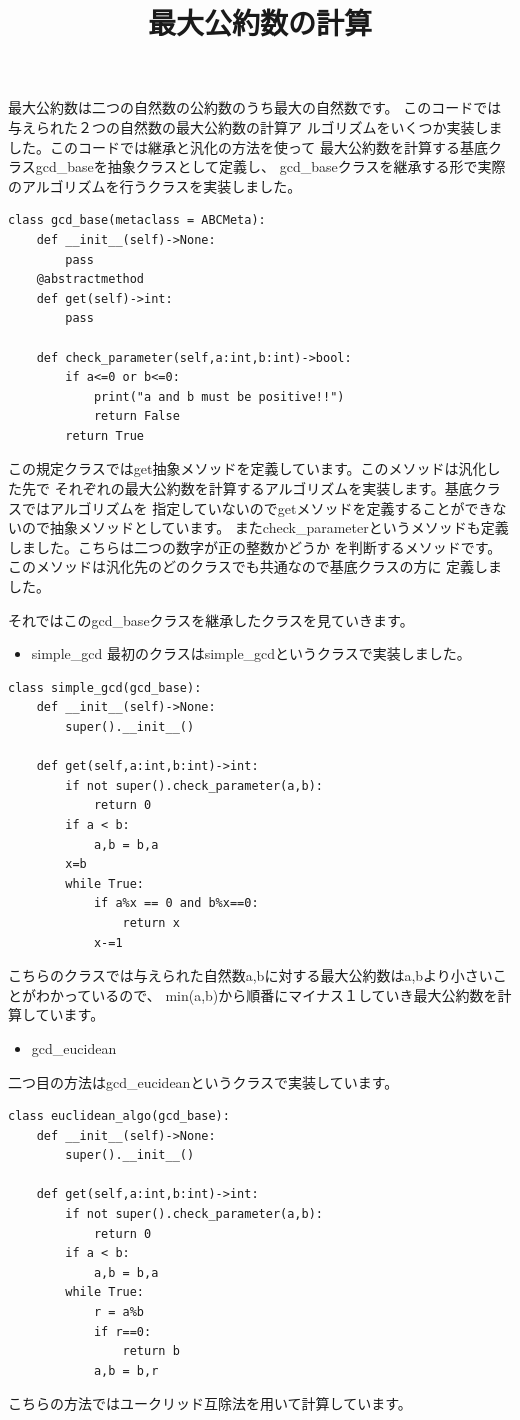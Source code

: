 \documentclass[dvipdfmx]{jarticle}
\title{最大公約数の計算}
\author{}
\date{}
\begin{document}
\maketitle
最大公約数は二つの自然数の公約数のうち最大の自然数です。
このコードでは与えられた２つの自然数の最大公約数の計算ア
ルゴリズムをいくつか実装しました。このコードでは継承と汎化の方法を使って
最大公約数を計算する基底クラスgcd\_baseを抽象クラスとして定義し、
gcd\_baseクラスを継承する形で実際のアルゴリズムを行うクラスを実装しました。
\begin{lstlisting}[caption=gcd\_base,label=base]
class gcd_base(metaclass = ABCMeta):
    def __init__(self)->None:
        pass
    @abstractmethod
    def get(self)->int:
        pass

    def check_parameter(self,a:int,b:int)->bool:
        if a<=0 or b<=0:
            print("a and b must be positive!!")
            return False
        return True
 \end{lstlisting}
この規定クラスではget抽象メソッドを定義しています。このメソッドは汎化した先で
それぞれの最大公約数を計算するアルゴリズムを実装します。基底クラスではアルゴリズムを
指定していないのでgetメソッドを定義することができないので抽象メソッドとしています。
またcheck\_parameterというメソッドも定義しました。こちらは二つの数字が正の整数かどうか
を判断するメソッドです。このメソッドは汎化先のどのクラスでも共通なので基底クラスの方に
定義しました。

それではこのgcd\_baseクラスを継承したクラスを見ていきます。
\begin{itemize}
\item simple\_gcd
最初のクラスはsimple\_gcdというクラスで実装しました。
\end{itemize}
\begin{lstlisting}[caption=gcd\_simple,label=simple]
class simple_gcd(gcd_base):
    def __init__(self)->None:
        super().__init__()

    def get(self,a:int,b:int)->int:
        if not super().check_parameter(a,b):
            return 0
        if a < b:
            a,b = b,a
        x=b
        while True:
            if a%x == 0 and b%x==0:
                return x
            x-=1
 \end{lstlisting}
 こちらのクラスでは与えられた自然数a,bに対する最大公約数はa,bより小さいことがわかっているので、
 min(a,b)から順番にマイナス１していき最大公約数を計算しています。
 \begin{itemize}
\item gcd\_eucidean
\end{itemize}
二つ目の方法はgcd\_eucideanというクラスで実装しています。
\begin{lstlisting}[caption=gcd\_eucidean,label=euclidean]
 class euclidean_algo(gcd_base):
    def __init__(self)->None:
        super().__init__()

    def get(self,a:int,b:int)->int:
        if not super().check_parameter(a,b):
            return 0
        if a < b:
            a,b = b,a
        while True:
            r = a%b
            if r==0:
                return b
            a,b = b,r
 \end{lstlisting} 
 こちらの方法ではユークリッド互除法を用いて計算しています。
 
\end{document}
